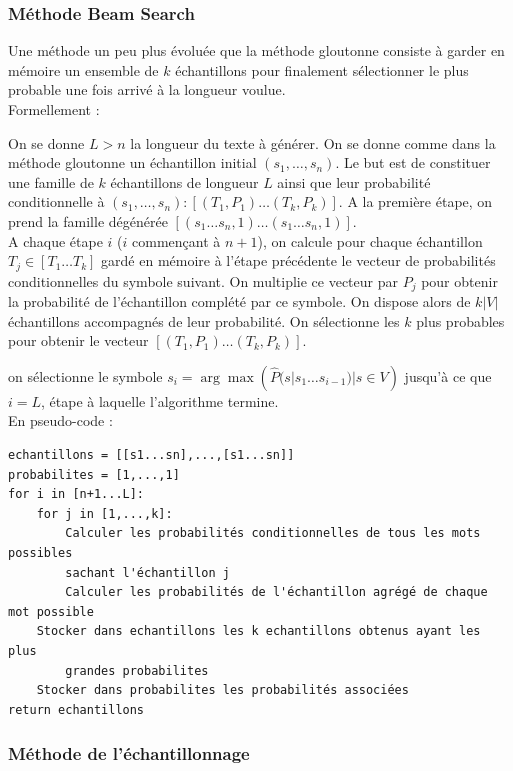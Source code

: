 \subsubsection{Méthode Beam Search}
Une méthode un peu plus évoluée que la méthode gloutonne consiste à garder en mémoire un ensemble de $k$ échantillons pour finalement sélectionner le plus probable une fois arrivé à la longueur voulue. \\

Formellement :

On se donne $L>n$ la longueur du texte à générer.
On se donne comme dans la méthode gloutonne un échantillon initial $(s_1,\ldots, s_n)$.
Le but est de constituer une famille de $k$ échantillons de longueur $L$ ainsi que leur probabilité conditionnelle à $(s_1,\ldots,s_n) : [(T_1,P_1)\ldots(T_k,P_k)]$.
A la première étape, on prend la famille dégénérée $[(s_1\ldots s_n, 1)\ldots (s_1\ldots s_n, 1)]$. \\

A chaque étape $i$ ($i$ commençant à $n+1$), on calcule pour chaque échantillon $T_j \in [T_1\ldots T_k]$ gardé en mémoire à l'étape précédente le vecteur de probabilités conditionnelles du symbole suivant. On multiplie ce vecteur par $P_j$ pour obtenir la probabilité de l'échantillon complété par ce symbole.
On dispose alors de $k\vert V \vert$ échantillons accompagnés de leur probabilité. On sélectionne les $k$ plus probables pour obtenir le vecteur $[(T_1,P_1)\ldots(T_k,P_k)]$.

on sélectionne le symbole $s_i = \arg\max({\widehat{P}(s|s_1\ldots s_{i-1}) | s \in V})$ jusqu'à ce que $i=L$, étape à laquelle l'algorithme termine. \\

En pseudo-code :
\begin{verbatim}
echantillons = [[s1...sn],...,[s1...sn]]
probabilites = [1,...,1]
for i in [n+1...L]:
    for j in [1,...,k]:
        Calculer les probabilités conditionnelles de tous les mots possibles
        sachant l'échantillon j
        Calculer les probabilités de l'échantillon agrégé de chaque mot possible
    Stocker dans echantillons les k echantillons obtenus ayant les plus
        grandes probabilites
    Stocker dans probabilites les probabilités associées
return echantillons
\end{verbatim}

\subsubsection{Méthode de l'échantillonnage}

